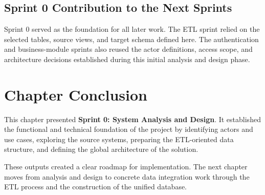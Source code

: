 \subsection{Sprint 0 Contribution to the Next Sprints}
Sprint 0 served as the foundation for all later work. The ETL sprint relied on the selected tables, source views, and target schema defined here. The authentication and business-module sprints also reused the actor definitions, access scope, and architecture decisions established during this initial analysis and design phase.

\section{Chapter Conclusion}
This chapter presented \textbf{Sprint 0: System Analysis and Design}. It established the functional and technical foundation of the project by identifying actors and use cases, exploring the source systems, preparing the ETL-oriented data structure, and defining the global architecture of the solution.

These outputs created a clear roadmap for implementation. The next chapter moves from analysis and design to concrete data integration work through the ETL process and the construction of the unified database.
